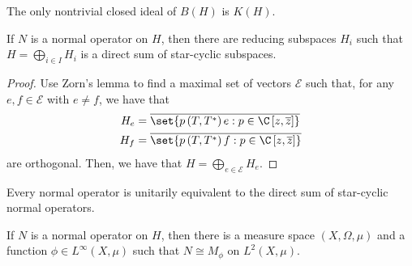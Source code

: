 \documentclass[10pt]{mypackage}
\begin{document}
\begin{corollary}
  The only nontrivial closed ideal of $B(H)$ is $K(H)$.
\end{corollary}
\begin{proposition}
  If $N$ is a normal operator on $H$, then there are reducing subspaces $H_i$ such that $H = \bigoplus_{i\in I}H_i$ is a direct sum of star-cyclic subspaces.
\end{proposition}
\begin{proof}
  Use Zorn's lemma to find a maximal set of vectors $ \mathcal{E} $ such that, for any $e,f\in \mathcal{E}$ with $e\neq f$, we have that
  \begin{align*}
    H_e &= \overline{\set{p\left( T,T^{\ast} \right)e : p\in \C\left[ z, \overline{z} \right]}}\\
    H_f &= \overline{\set{p\left( T,T^{\ast} \right)f : p\in \C\left[ z, \overline{z} \right]}}
  \end{align*}
  are orthogonal. Then, we have that $H = \bigoplus_{e\in \mathcal{E}}H_e$.
\end{proof}
\begin{corollary}
  Every normal operator is unitarily equivalent to the direct sum of star-cyclic normal operators.
\end{corollary}
\begin{theorem}
  If $N$ is a normal operator on $H$, then there is a measure space $\left( X,\Omega,\mu \right)$ and a function $\phi\in L^{\infty}\left( X, \mu \right)$ such that $N\cong M_{\phi}$ on $L^2\left( X, \mu \right)$.
\end{theorem}
\end{document}
